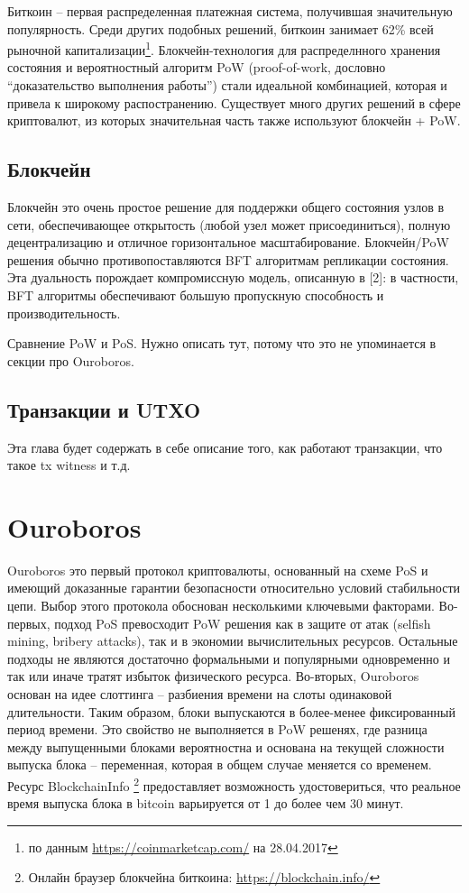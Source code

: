 \documentclass[specification,annotation]{itmo-student-thesis}
\begin{document}
Биткоин -- первая распределенная платежная система, получившая
значительную популярность. Среди других подобных решений, биткоин
занимает 62\% всей рыночной капитализации\footnote{по данным
  \url{https://coinmarketcap.com/} на 28.04.2017}. Блокчейн-технология
для распределнного хранения состояния и вероятностный алгоритм PoW
(proof-of-work, дословно ``доказательство выполнения работы'') стали
идеальной комбинацией, которая и привела к широкому
распостранению. Существует много других решений в сфере криптовалют,
из которых значительная часть также используют блокчейн + PoW.

\subsection{Блокчейн}

Блокчейн это очень простое решение для поддержки общего состояния
узлов в сети, обеспечивающее открытость (любой узел может
присоединиться), полную децентрализацию и отличное горизонтальное
масштабирование. Блокчейн/PoW решения обычно противопоставляются BFT
алгоритмам репликации состояния. Эта дуальность порождает
компромиссную модель, описанную в [2]: в частности, BFT алгоритмы
обеспечивают большую пропускную способность и производительность.

Сравнение PoW и PoS. Нужно описать тут, потому что это не упоминается
в секции про Ouroboros.

\subsection{Транзакции и UTXO}

Эта глава будет содержать в себе описание того, как работают
транзакции, что такое tx witness и т.д.

\section{Ouroboros}

Ouroboros \cite{ouroboros} это первый протокол криптовалюты,
основанный на схеме PoS и имеющий доказанные гарантии безопасности
относительно условий стабильности цепи. Выбор этого протокола
обоснован несколькими ключевыми факторами. Во-первых, подход PoS
превосходит PoW решения как в защите от атак (selfish mining, bribery
attacks), так и в экономии вычислительных ресурсов. Остальные подходы
не являются достаточно формальными и популярными одновременно и так
или иначе тратят избыток физического ресурса. Во-вторых, Ouroboros
основан на идее слоттинга -- разбиения времени на слоты одинаковой
длительности. Таким образом, блоки выпускаются в более-менее
фиксированный период времени. Это свойство не выполняется в PoW
решенях, где разница между выпущенными блоками вероятностна и основана
на текущей сложности выпуска блока -- переменная, которая в общем
случае меняется со временем. Ресурс BlockchainInfo \footnote{Онлайн
  браузер блокчейна биткоина: \url{https://blockchain.info/}}
предоставляет возможность удостовериться, что реальное время выпуска
блока в bitcoin варьируется от 1 до более чем 30 минут.
\end{document}
